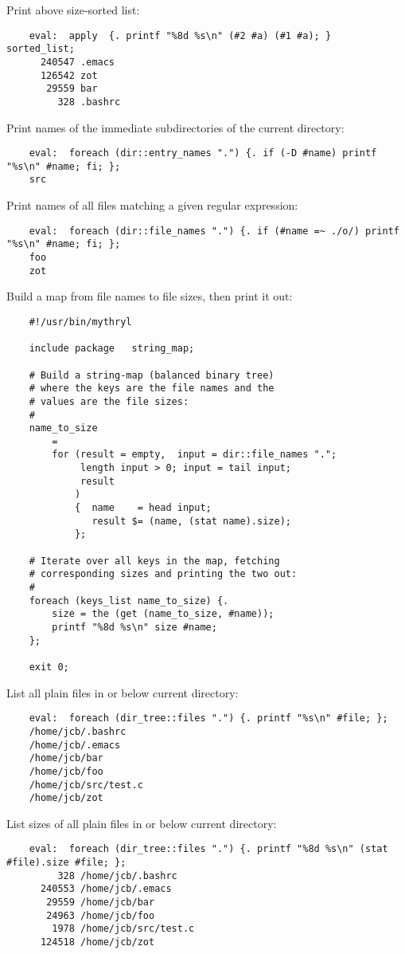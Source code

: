 Print above size-sorted list:
\begin{verbatim}
    eval:  apply  {. printf "%8d %s\n" (#2 #a) (#1 #a); }  sorted_list;
      240547 .emacs
      126542 zot
       29559 bar
         328 .bashrc
\end{verbatim}

Print names of the immediate subdirectories of the current directory:
\begin{verbatim}
    eval:  foreach (dir::entry_names ".") {. if (-D #name) printf "%s\n" #name; fi; };
    src
\end{verbatim}

Print names of all files matching a given regular expression:
\begin{verbatim}
    eval:  foreach (dir::file_names ".") {. if (#name =~ ./o/) printf "%s\n" #name; fi; };
    foo
    zot
\end{verbatim}

Build a map from file names to file sizes, then print it out:
\begin{verbatim}
    #!/usr/bin/mythryl

    include package   string_map;

    # Build a string-map (balanced binary tree)
    # where the keys are the file names and the
    # values are the file sizes:
    #
    name_to_size
        =
        for (result = empty,  input = dir::file_names ".";
             length input > 0; input = tail input;
             result
            )
            {  name    = head input;
               result $= (name, (stat name).size);
            };

    # Iterate over all keys in the map, fetching
    # corresponding sizes and printing the two out:
    #
    foreach (keys_list name_to_size) {.
        size = the (get (name_to_size, #name));
        printf "%8d %s\n" size #name;
    };

    exit 0;
\end{verbatim}


List all plain files in or below current directory:
\begin{verbatim}
    eval:  foreach (dir_tree::files ".") {. printf "%s\n" #file; };
    /home/jcb/.bashrc
    /home/jcb/.emacs
    /home/jcb/bar
    /home/jcb/foo
    /home/jcb/src/test.c
    /home/jcb/zot
\end{verbatim}

List sizes of all plain files in or below current directory:
\begin{verbatim}
    eval:  foreach (dir_tree::files ".") {. printf "%8d %s\n" (stat #file).size #file; };
         328 /home/jcb/.bashrc
      240553 /home/jcb/.emacs
       29559 /home/jcb/bar
       24963 /home/jcb/foo
        1978 /home/jcb/src/test.c
      124518 /home/jcb/zot
\end{verbatim}

